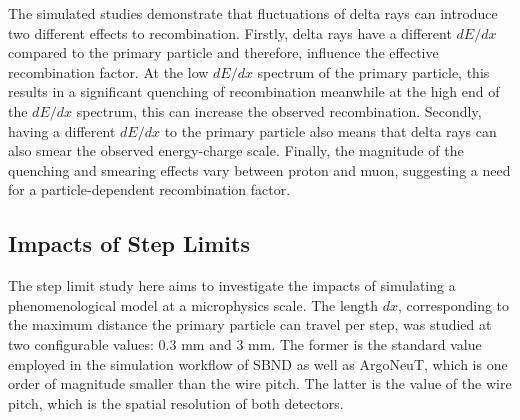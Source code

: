The simulated studies demonstrate that fluctuations of delta rays can introduce two different effects to recombination.
Firstly, delta rays have a different $dE/dx$ compared to the primary particle and therefore, influence the effective recombination factor.
At the low $dE/dx$ spectrum of the primary particle, this results in a significant quenching of recombination meanwhile at the high end of the $dE/dx$ spectrum, this can increase the observed recombination.
Secondly, having a different $dE/dx$ to the primary particle also means that delta rays can also smear the observed energy-charge scale.
Finally, the magnitude of the quenching and smearing effects vary between proton and muon, suggesting a need for a particle-dependent recombination factor.   

\subsection{Impacts of Step Limits}
\label{sec:impactStepLimit}

The step limit study here aims to investigate the impacts of simulating a phenomenological model at a microphysics scale.
The length $dx$, corresponding to the maximum distance the primary particle can travel per step, was studied at two configurable values: 0.3 mm and 3 mm.     
The former is the standard value employed in the simulation workflow of SBND as well as ArgoNeuT, which is one order of magnitude smaller than the wire pitch. 
The latter is the value of the wire pitch, which is the spatial resolution of both detectors.

